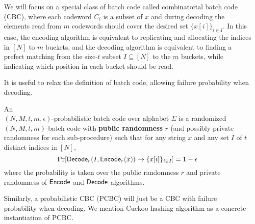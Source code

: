 We will focus on a special class of batch code called combinatorial batch code (CBC)\cite{10.1145/1007352.1007396,cryptoeprint:2008/306}, where each codeword $C_i$ is a subset of $x$ and during decoding the elements read from $m$ codewords should cover the desired set $\{x[i]\}_{i\in I}$. 
 In this case, the encoding algorithm is equivalent to replicating and allocating the indices in $[N]$ to $m$ buckets, and the decoding algorithm is equivalent to finding a prefect matching from the size-$t$ subset $I\subseteq[N]$ to the $m$ buckets, while indicating which position in each bucket should be read. 


It is useful to relax the definition of batch code, allowing failure probability when decoding. 

\begin{definition}
An\\ $(N,M,t,m,\epsilon)$-probabilistic batch code over alphabet $\Sigma$ is a randomized $(N,M,t,m)$-batch code with \textbf{public randomness} $r$ (and possibly private randomness for each sub-procedure) such that for any string $x$ and any set $I$ of $t$ distinct indices in $[N]$, 
\[
  \Pr[{\sf Decode}_r(I,{\sf Encode}_r(x))\rightarrow \{x[i]\}_{i\in I}] = 1-\epsilon
\]
where the probability is taken over the public randomness $r$ and private randomness of  ${\sf Encode}$ and ${\sf Decode}$ algorithms. 
\end{definition}

Similarly, a probabilistic CBC (PCBC) will just be a CBC with failure probability when decoding. We mention Cuckoo hashing algorithm\cite{10.1007/3-540-44676-1_10} as a concrete instantiation of PCBC\cite{cryptoeprint:2017/1142}.

